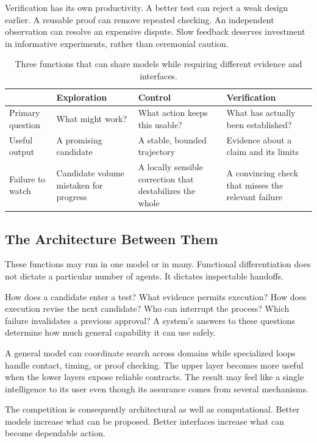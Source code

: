 \documentclass[11pt,openany]{book}
\begin{document}
Verification has its own productivity. A better test can reject a weak design earlier. A reusable proof can remove repeated checking. An independent observation can resolve an expensive dispute. Slow feedback deserves investment in informative experiments, rather than ceremonial caution.

\begin{table}[ht]
\centering\small
\begin{tabularx}{\textwidth}{@{}lYYY@{}}
\toprule
& Exploration & Control & Verification\\
\midrule
Primary question & What might work? & What action keeps this usable? & What has actually been established?\\
Useful output & A promising candidate & A stable, bounded trajectory & Evidence about a claim and its limits\\
Failure to watch & Candidate volume mistaken for progress & A locally sensible correction that destabilizes the whole & A convincing check that misses the relevant failure\\
\bottomrule
\end{tabularx}
\caption{Three functions that can share models while requiring different evidence and interfaces.}
\end{table}

\subsection{The Architecture Between Them}

These functions may run in one model or in many. Functional differentiation does not dictate a particular number of agents. It dictates inspectable handoffs.

How does a candidate enter a test? What evidence permits execution? How does execution revise the next candidate? Who can interrupt the process? Which failure invalidates a previous approval? A system's answers to these questions determine how much general capability it can use safely.

A general model can coordinate search across domains while specialized loops handle contact, timing, or proof checking. The upper layer becomes more useful when the lower layers expose reliable contracts. The result may feel like a single intelligence to its user even though its assurance comes from several mechanisms.

The competition is consequently architectural as well as computational. Better models increase what can be proposed. Better interfaces increase what can become dependable action.
\end{document}
